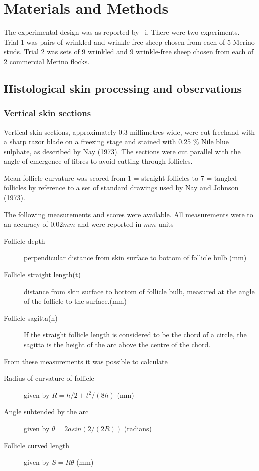 \documentclass{article}
\begin{document}
\section{Materials and Methods}
The experimental design was as reported by ~\cite{watts-2020}i. There were  two experiments. Trial 1 was pairs of wrinkled and wrinkle-free sheep chosen from each of 5 Merino studs. Trial 2 was sets of 9 wrinkled and 9 wrinkle-free sheep chosen from each of 2 commercial Merino flocks.

\subsection{Histological skin processing and observations}

\subsubsection{Vertical skin sections}
Vertical skin sections, approximately 0.3 millimetres wide, were cut freehand with a sharp razor blade on a freezing stage and stained with 0.25 \% Nile blue sulphate, as described by Nay (1973).  The sections were cut parallel with the angle of emergence of fibres to avoid cutting through follicles.

 Mean follicle curvature was scored from 1 = straight follicles to 7 = tangled follicles by reference to a set of standard drawings used by Nay and Johnson (1973).  

The following measurements and scores were available.  All measurements were to an accuracy of $0.02mm$ and were reported in $mm$ units
\begin{description}
\item[Follicle depth] perpendicular distance from skin surface to bottom of follicle bulb (mm)
\item[Follicle straight length(t)] distance from skin surface to bottom of follicle bulb, measured at the angle of the follicle to the surface.(mm)
\item[Follicle sagitta(h)] If the straight follicle length is considered to be the chord of a circle, the sagitta is the height of the arc above the centre of the chord.
\end{description}

From these measurements it was possible to calculate
\begin{description}
\item[Radius of curvature of follicle]  given by $R = h/2 + t^{2}/(8h)$ (mm)
\item[Angle subtended by the arc] given by $\theta = 2 asin(2/(2R))$ (radians)
\item[Follicle curved length] given by $S = R \theta$ (mm)
\end{description}
\end{document}
